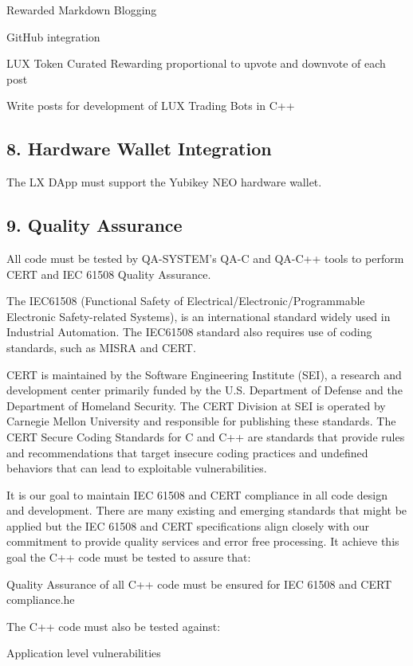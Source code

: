 \documentclass[11pt]{article}
\begin{document}
Rewarded Markdown Blogging


GitHub integration


LUX Token Curated Rewarding proportional to upvote and downvote of each post


Write posts for development of LUX Trading Bots in C++


\subsection{8. Hardware Wallet Integration}

The LX DApp must support the Yubikey NEO hardware wallet.


\subsection{9. Quality Assurance}

All code must be tested by QA-SYSTEM's QA-C and QA-C++ tools to perform CERT and IEC 61508 Quality Assurance.


The IEC61508 (Functional Safety of Electrical/Electronic/Programmable Electronic Safety-related Systems), is an international standard widely used in Industrial Automation. The IEC61508 standard also requires use of coding standards, such as MISRA and CERT.


CERT is maintained by the Software Engineering Institute (SEI), a research and development center primarily funded by the U.S. Department of Defense and the Department of Homeland Security. The CERT Division at SEI is operated by Carnegie Mellon University and responsible for publishing these standards. The CERT\textregistered{} Secure Coding Standards for C and C++ are standards that provide rules and recommendations that target insecure coding practices and undefined behaviors that can lead to exploitable vulnerabilities.


It is our goal to maintain IEC 61508 and CERT compliance in all code design and development. There are many existing and emerging standards that might be applied but the IEC 61508 and CERT specifications align closely with our commitment to provide quality services and error free processing. It achieve this goal the C++ code must be tested to assure that:


Quality Assurance of all C++ code must be ensured for IEC 61508 and CERT compliance.he


The C++ code must also be tested against:


Application level vulnerabilities
\end{document}
